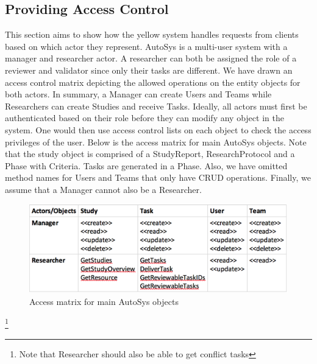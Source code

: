 \subsection{Providing Access Control}
This section aims to show how the yellow system handles requests from clients based on which actor they represent. AutoSys is a multi-user system with a manager and researcher actor. A researcher can both be assigned the role of a reviewer and validator since only their tasks are different. We have drawn an access control matrix depicting the allowed operations on the entity objects for both actors. In summary, a Manager can create Users and Teams while Researchers can create Studies and receive Tasks. Ideally, all actors must first be authenticated based on their role before they can modify any object in the system. One would then use access control lists on each object to check the access privileges of the user. 
Below is the access matrix for main AutoSys objects. Note that the study object is comprised of a StudyReport, ResearchProtocol and a Phase with Criteria. Tasks are generated in a Phase. Also, we have omitted method names for Users and Teams that only have CRUD operations. Finally, we assume that a Manager cannot also be a Researcher. 

\begin{figure}[H]
	\includegraphics[width = \linewidth]{Images/accessmatrix}
	\caption{Access matrix for main AutoSys objects}
	\label{fig:accessmatrix}
\end{figure}\footnote{Note that Researcher should also be able to get conflict tasks}